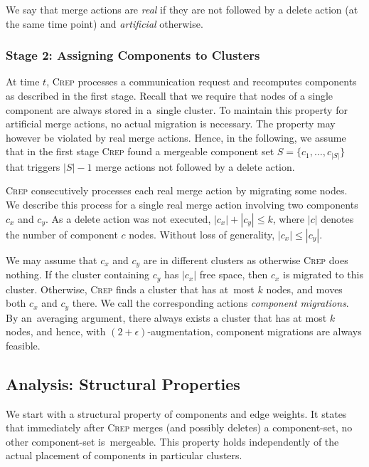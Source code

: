 \documentclass[11pt,a4paper]{scrartcl}
\newcommand{\CREP}{\textsc{Crep}\xspace}
\newcommand{\eps}{\ensuremath{\epsilon}}
\begin{document}
We say that merge actions are \emph{real} if they are not followed
by a delete action (at the same time point) and \emph{artificial} otherwise. 



\subsubsection{Stage 2: Assigning Components to Clusters}

At time $t$, \CREP processes a communication request and recomputes components
as described in the first stage. Recall that we require that nodes of a single
component are always stored in a~single cluster. To maintain this property for
artificial merge actions, no actual migration is necessary. The property may
however be violated by real merge actions. Hence, in the following, we assume
that in the first stage \CREP found a mergeable component set $S = \{ c_1, 
\ldots, c_{|S|} \}$ that triggers $|S|-1$ merge actions not 
followed by a delete action.

\CREP consecutively processes each real merge action by migrating some nodes.
We describe this process for a single real merge action involving two
components $c_x$ and $c_y$. As a delete action was not executed, $|c_x| +
|c_y| \leq k$, where $|c|$ denotes the number of component $c$ nodes.
Without loss of generality, $|c_x| \leq |c_y|$.

We may assume that $c_x$ and $c_y$ are in different clusters as otherwise
\CREP does nothing. If the cluster containing $c_y$ has $|c_x|$ free space,
then $c_x$ is migrated to this cluster. Otherwise, \CREP finds a cluster that
has at~most $k$ nodes, and moves both $c_x$ and $c_y$ there. We call the
corresponding actions \emph{component migrations}. By an~averaging argument,
there always exists a cluster that has at most $k$ nodes, and hence, with
$(2+\eps)$-augmentation, component migrations are always feasible.



\subsection{Analysis: Structural Properties}

We start with a structural property of components and edge weights.
It states that immediately after \CREP merges (and
possibly deletes) a component-set, no other component-set is~mergeable. This
property holds independently of the actual placement of components in
particular clusters.
\end{document}
